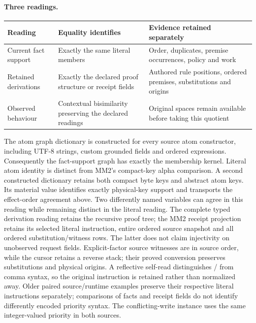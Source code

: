 \documentclass[10pt]{article}
\newcommand{\api}[1]{\texttt{\detokenize{#1}}}
\begin{document}
\paragraph{Three readings.}
\begin{center}
\begin{tabular}{@{}>{\raggedright\arraybackslash}p{.20\linewidth}
  >{\raggedright\arraybackslash}p{.34\linewidth}
  >{\raggedright\arraybackslash}p{.36\linewidth}@{}}
\toprule
Reading & Equality identifies & Evidence retained separately \\
\midrule
Current fact support & Exactly the same literal members & Order, duplicates,
premise occurrences, policy and work \\
Retained derivations & Exactly the declared proof structure or receipt fields
& Authored rule positions, ordered premises, substitutions and origins \\
Observed behaviour & Contextual bisimilarity preserving the declared readings
& Original spaces remain available before taking this quotient \\
\bottomrule
\end{tabular}
\end{center}

The atom graph dictionary is constructed for every source atom constructor,
including UTF-8 strings, custom grounded fields and ordered expressions.
Consequently the fact-support graph has exactly the membership kernel.
Literal atom identity is distinct from MM2's compact-key alpha comparison.
A second constructed dictionary retains both compact byte keys and abstract
atom keys. Its material value identifies exactly physical-key support and
transports the effect-order agreement above. Two differently named variables
can agree in this reading while remaining distinct in the literal reading.
The complete typed derivation reading retains the recursive proof tree;
the MM2 receipt projection retains its selected literal instruction, entire
ordered source snapshot and all ordered substitution/witness rows. The latter
does not claim injectivity on unobserved request fields.
Explicit-factor source witnesses are in source order, while the cursor retains
a reverse stack; their proved conversion preserves substitutions and physical
origins. A reflective self-read distinguishes \api{I}/\api{BTM} from comma
syntax, so the original instruction is retained rather than normalized away.
Older paired source/runtime examples preserve their respective literal
instructions separately; comparisons of facts and receipt fields do not
identify differently encoded priority syntax. The conflicting-write instance
uses the same integer-valued priority in both sources.
\end{document}
